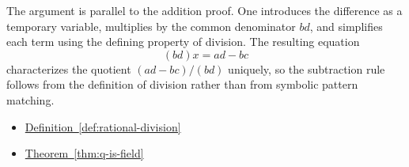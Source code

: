 \begin{remark*}
The argument is parallel to the addition proof.  One introduces the
difference as a temporary variable, multiplies by the common denominator
$bd$, and simplifies each term using the defining property of division.
The resulting equation
\[
(bd)x=ad-bc
\]
characterizes the quotient $(ad-bc)/(bd)$ uniquely, so the subtraction rule
follows from the definition of division rather than from symbolic pattern
matching.
\end{remark*}

\begin{dependencies}
\begin{itemize}
  \item \hyperref[def:rational-division]{Definition~\ref*{def:rational-division}}
  \item \hyperref[thm:q-is-field]{Theorem~\ref*{thm:q-is-field}}
\end{itemize}
\end{dependencies}

\clearpage
